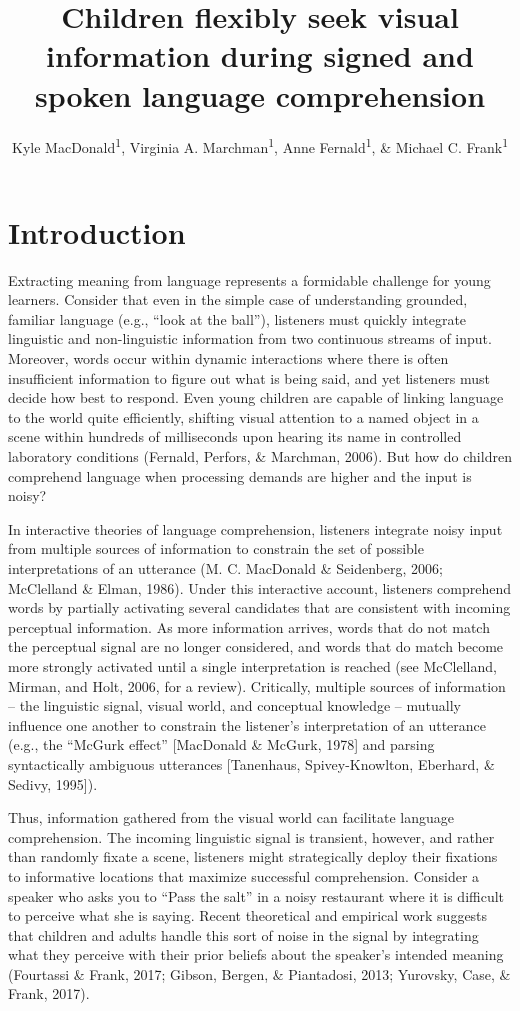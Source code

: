 \documentclass[,man,floatsintext]{apa6}
\title{Children flexibly seek visual information during signed and spoken
language comprehension}
\author{Kyle MacDonald\textsuperscript{1}, Virginia A.
Marchman\textsuperscript{1}, Anne Fernald\textsuperscript{1}, \& Michael
C. Frank\textsuperscript{1}}
\date{}
\affiliation{
\vspace{0.5cm}
\textsuperscript{1} Stanford University}
\begin{document}
\maketitle

\section{Introduction}\label{introduction}

Extracting meaning from language represents a formidable challenge for
young learners. Consider that even in the simple case of understanding
grounded, familiar language (e.g., \enquote{look at the ball}),
listeners must quickly integrate linguistic and non-linguistic
information from two continuous streams of input. Moreover, words occur
within dynamic interactions where there is often insufficient
information to figure out what is being said, and yet listeners must
decide how best to respond. Even young children are capable of linking
language to the world quite efficiently, shifting visual attention to a
named object in a scene within hundreds of milliseconds upon hearing its
name in controlled laboratory conditions (Fernald, Perfors, \& Marchman,
2006). But how do children comprehend language when processing demands
are higher and the input is noisy?

In interactive theories of language comprehension, listeners integrate
noisy input from multiple sources of information to constrain the set of
possible interpretations of an utterance (M. C. MacDonald \& Seidenberg,
2006; McClelland \& Elman, 1986). Under this interactive account,
listeners comprehend words by partially activating several candidates
that are consistent with incoming perceptual information. As more
information arrives, words that do not match the perceptual signal are
no longer considered, and words that do match become more strongly
activated until a single interpretation is reached (see McClelland,
Mirman, and Holt, 2006, for a review). Critically, multiple sources of
information -- the linguistic signal, visual world, and conceptual
knowledge -- mutually influence one another to constrain the listener's
interpretation of an utterance (e.g., the \enquote{McGurk effect}
{[}MacDonald \& McGurk, 1978{]} and parsing syntactically ambiguous
utterances {[}Tanenhaus, Spivey-Knowlton, Eberhard, \& Sedivy, 1995{]}).

Thus, information gathered from the visual world can facilitate language
comprehension. The incoming linguistic signal is transient, however, and
rather than randomly fixate a scene, listeners might strategically
deploy their fixations to informative locations that maximize successful
comprehension. Consider a speaker who asks you to \enquote{Pass the
salt} in a noisy restaurant where it is difficult to perceive what she
is saying. Recent theoretical and empirical work suggests that children
and adults handle this sort of noise in the signal by integrating what
they perceive with their prior beliefs about the speaker's intended
meaning (Fourtassi \& Frank, 2017; Gibson, Bergen, \& Piantadosi, 2013;
Yurovsky, Case, \& Frank, 2017).
\end{document}
